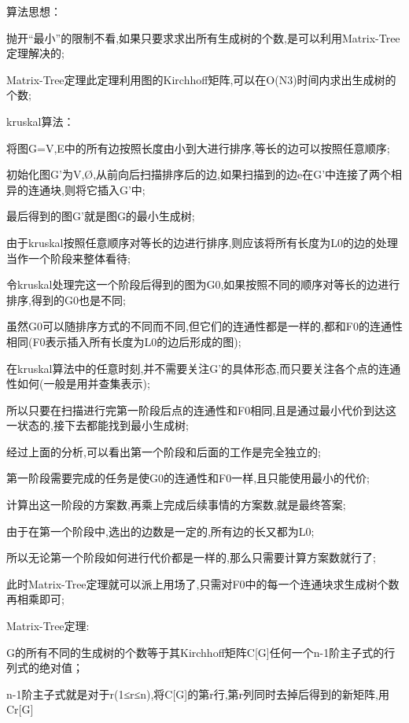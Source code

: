 算法思想：

抛开“最小”的限制不看,如果只要求求出所有生成树的个数,是可以利用Matrix-Tree定理解决的;

Matrix-Tree定理此定理利用图的Kirchhoff矩阵,可以在O(N3)时间内求出生成树的个数;

kruskal算法：

将图G={V,E}中的所有边按照长度由小到大进行排序,等长的边可以按照任意顺序;

初始化图G’为{V,Ø},从前向后扫描排序后的边,如果扫描到的边e在G’中连接了两个相异的连通块,则将它插入G’中;

最后得到的图G’就是图G的最小生成树;

由于kruskal按照任意顺序对等长的边进行排序,则应该将所有长度为L0的边的处理当作一个阶段来整体看待;

令kruskal处理完这一个阶段后得到的图为G0,如果按照不同的顺序对等长的边进行排序,得到的G0也是不同;

虽然G0可以随排序方式的不同而不同,但它们的连通性都是一样的,都和F0的连通性相同(F0表示插入所有长度为L0的边后形成的图);

在kruskal算法中的任意时刻,并不需要关注G’的具体形态,而只要关注各个点的连通性如何(一般是用并查集表示);

所以只要在扫描进行完第一阶段后点的连通性和F0相同,且是通过最小代价到达这一状态的,接下去都能找到最小生成树;

经过上面的分析,可以看出第一个阶段和后面的工作是完全独立的;

第一阶段需要完成的任务是使G0的连通性和F0一样,且只能使用最小的代价;

计算出这一阶段的方案数,再乘上完成后续事情的方案数,就是最终答案;

由于在第一个阶段中,选出的边数是一定的,所有边的长又都为L0;

所以无论第一个阶段如何进行代价都是一样的,那么只需要计算方案数就行了;

此时Matrix-Tree定理就可以派上用场了,只需对F0中的每一个连通块求生成树个数再相乘即可;

Matrix-Tree定理:

G的所有不同的生成树的个数等于其Kirchhoff矩阵C[G]任何一个n-1阶主子式的行列式的绝对值；

n-1阶主子式就是对于r(1≤r≤n),将C[G]的第r行,第r列同时去掉后得到的新矩阵,用Cr[G]

